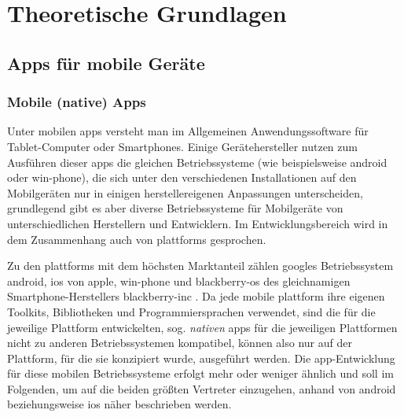 \part{Theoretische Grundlagen}	\label{sec:grundlagen}

\chapter{Apps für mobile Geräte}

\section{Mobile (native) Apps} \label{sec:native}
Unter mobilen \glspl{app} versteht man im Allgemeinen Anwendungssoftware für Tablet-Computer oder Smartphones. 
Einige Gerätehersteller nutzen zum Ausführen dieser \glspl{app} die gleichen Betriebssysteme (wie beispielsweise \gls{android} oder \gls{win-phone}), die sich unter den verschiedenen Installationen auf den Mobilgeräten nur in einigen herstellereigenen Anpassungen unterscheiden, grundlegend gibt es aber diverse Betriebssysteme für Mobilgeräte von unterschiedlichen Herstellern und Entwicklern.
Im Entwicklungsbereich wird in dem Zusammenhang auch von \glspl{plattform} gesprochen.

Zu den \glspl{plattform} mit dem höchsten Marktanteil zählen \glspl{google} Betriebssystem \gls{android}, \gls{ios} von \gls{apple}, \gls{win-phone} und \gls{blackberry-os} des gleichnamigen Smartphone-Herstellers \gls{blackberry-inc} \cite{platforms-marketshare}.
Da jede mobile \gls{plattform} ihre eigenen Toolkits, Bibliotheken und Programmiersprachen verwendet, sind die für die jeweilige Plattform entwickelten, sog. \emph{nativen} \glspl{app} für die jeweiligen Plattformen nicht zu anderen Betriebssystemen kompatibel, können also nur auf der Plattform, für die sie konzipiert wurde, ausgeführt werden.
Die \gls{app}-Entwicklung für diese mobilen Betriebssysteme erfolgt mehr oder weniger ähnlich und soll im Folgenden, um auf die beiden größten Vertreter einzugehen, anhand von \gls{android} beziehungsweise \gls{ios} näher beschrieben werden.

